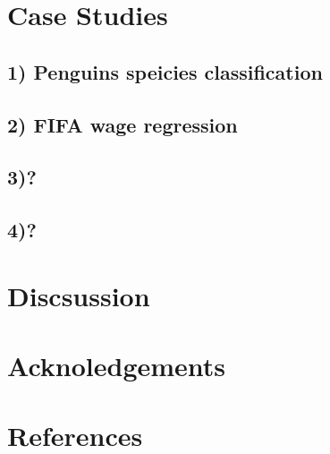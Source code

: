 \documentclass[
]{article}
\begin{document}
\hypertarget{sec:casestudies}{%
\section{Case Studies}\label{sec:casestudies}}

\hypertarget{penguins-speicies-classification}{%
\subsection{1) Penguins speicies classification}\label{penguins-speicies-classification}}

\hypertarget{fifa-wage-regression}{%
\subsection{2) FIFA wage regression}\label{fifa-wage-regression}}

\hypertarget{section}{%
\subsection{3)?}\label{section}}

\hypertarget{section-1}{%
\subsection{4)?}\label{section-1}}

\hypertarget{discsussion}{%
\section{Discsussion}\label{discsussion}}

\hypertarget{acknoledgements}{%
\section{Acknoledgements}\label{acknoledgements}}

\hypertarget{references}{%
\section*{References}\label{references}}
\end{document}
